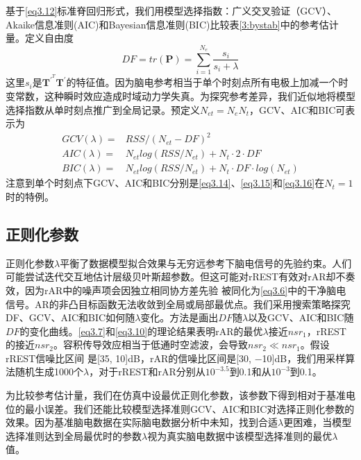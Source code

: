 基于\eqref{eq3.12}标准脊回归形式，我们用模型选择指数：广义交叉验证（GCV）、Akaike信息准则(AIC)和Bayesian信息准则(BIC)比较表\ref{3:bystab}中的参考估计量。定义自由度
\begin{equation}
DF=tr(\mathbf{P})=\sum_{i=1}^{N_{e}}\dfrac{s_i}{s_i+\lambda}
\end{equation}
这里$s_i$是$\mathbf{T}^{\prime^T}\mathbf{T}^\prime$的特征值。因为脑电参考相当于单个时刻点所有电极上加减一个时变常数，这种瞬时效应造成时域动力学失真。为探究参考差异，我们近似地将模型选择指数从单时刻点推广到全局记录。预定义$N_{et}=N_eN_t$，GCV、AIC和BIC可表示为
\begin{align}
GCV(\lambda)={} &RSS/(N_{et}-DF)^2\label{eq3.14}\\
AIC(\lambda)={} &N_{et}log(RSS/{N_{et}})+N_t\cdot{2}\cdot{DF}\label{eq3.15}\\
BIC(\lambda)={} &N_{et}log(RSS/{N_{et}})+N_t\cdot{DF}\cdot{log(N_{et})}\label{eq3.16}
\end{align}
注意到单个时刻点下GCV、AIC和BIC分别是\eqref{eq3.14}、\eqref{eq3.15}和\eqref{eq3.16}在$N_t=1$时的特例。
\subsection{正则化参数}
正则化参数$\lambda$平衡了数据模型拟合效果与无穷远参考下脑电信号的先验约束。人们可能尝试迭代交互地估计层级贝叶斯超参数。但这可能对rREST有效对rAR却不奏效，因为rAR中的噪声项会因独立相同协方差先验
被同化为\eqref{eq3.6}中的干净脑电信号。AR的非凸目标函数无法收敛到全局或局部最优点。我们采用搜索策略探究DF、GCV、AIC和BIC如何随$\lambda$变化。方法是画出$DF$随$\lambda$以及GCV、AIC和BIC随$DF$的变化曲线。\eqref{eq3.7}和\eqref{eq3.10}的理论结果表明rAR的最优$\lambda$接近$nsr_1$，rREST的接近$nsr_2$。容积传导效应相当于低通时空滤波，会导致$nsr_2\ll{nsr_1}$。假设rREST信噪比区间
是[35, 10]dB，rAR的信噪比区间是[30, −10]dB，我们用采样算法随机生成1000个$\lambda$，对于rREST和rAR分别从$10^{-3.5}$到0.1和从$10^{-3}$到0.1。

为比较参考估计量，我们在仿真中设最优正则化参数，该参数下得到相对于基准电位的最小误差。我们还能比较模型选择准则GCV、AIC和BIC对选择正则化参数的效果。因为基准脑电数据在实际脑电数据分析中未知，找到合适$\lambda$更困难，当模型选择准则达到全局最优时的参数$\lambda$视为真实脑电数据中该模型选择准则的最优$\lambda$值。

